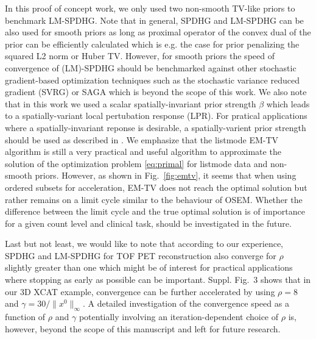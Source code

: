 In this proof of concept work, we only used two non-smooth TV-like priors
to benchmark LM-SPDHG. 
Note that in general, SPDHG and LM-SPDHG can be also used for smooth priors as long
as proximal operator of the convex dual of the prior can be efficiently calculated which is
e.g. the case for prior penalizing the squared L2 norm or Huber TV.
However, for smooth priors the speed of convergence of (LM)-SPDHG should be benchmarked against
other stochastic gradient-based optimization techniques such as the stochastic variance reduced gradient (SVRG) \cite{Johnson2013} or SAGA \cite{Defazio2014} which is beyond the scope of this work.
We also note that in this work we used a scalar spatially-invariant prior strength $\beta$ which
leads to a spatially-variant local pertubation response (LPR). 
For pratical applications where a spatially-invariant reponse is desirable, a spatially-varient prior 
strength should be used as described in \cite{Ahn2008,Tsai2020}.
We emphasize that the listmode EM-TV algorithm
is still a very practical and useful algorithm to approximate the solution 
of the optimization problem \eqref{eq:primal} for listmode data and non-smooth priors.
However, as shown in Fig.~\ref{fig:emtv}, it seems that when using ordered subsets for acceleration,
EM-TV does not reach the optimal solution but rather remains on a limit cycle similar to the
behaviour of OSEM.
Whether the difference between the limit cycle and the true optimal solution is of importance
for a given count level and clinical task, should be investigated in the future.


Last but not least, we would like to note that according to our experience, SPDHG and LM-SPDHG
for TOF PET reconstruction also converge for $\rho$ slightly greater than one which might
be of interest for practical applications where stopping as early as possible can be important.
Suppl. Fig.~3 shows that in our 3D XCAT example, convergence can be further accelerated by
using $\rho = 8$ and $\gamma = 30/ \|x^0\|_\infty$.
A detailed investigation of the convergence speed as a function of $\rho$ and $\gamma$ potentially
involving an iteration-dependent choice of $\rho$ \cite{Goldstein2015} is, however, 
beyond the scope of this manuscript and left for future research.

